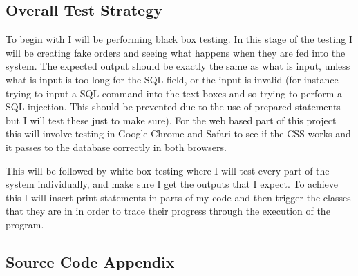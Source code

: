 \documentclass[
11pt, %
a4paper, %
oneside, %
headinclude,footinclude, %
BCOR5mm, %
]{scrartcl}
\begin{document}
\subsection{Overall Test Strategy}
To begin with I will be performing black box testing. In this stage of the testing I will be creating fake orders and seeing what happens when they are fed into the system. The expected output should be exactly the same as what is input, unless what is input is too long for the SQL field, or the input is invalid (for instance trying to input a SQL command into the text-boxes and so trying to perform a SQL injection. This should be prevented due to the use of prepared statements but I will test these just to make sure). For the web based part of this project this will involve testing in Google Chrome and Safari to see if the CSS works and it passes to the database correctly in both browsers.\par This will be followed by white box testing where I will test every part of the system individually, and make sure I get the outputs that I expect. To achieve this I will insert print statements in parts of my code and then trigger the classes that they are in in order to trace their progress through the execution of the program. 






\begin{appendices}
\section{Source Code Appendix}
\inputminted[linenos, breaklines]{java}{/Users/tsmoffat/kitordersystem/kitordersystem/kitordersystem/MainMenu.java}
\inputminted[linenos, breaklines]{java}{/Users/tsmoffat/kitordersystem/kitordersystem/kitordersystem/getConnection.java}
\inputminted[linenos, breaklines]{java}{/Users/tsmoffat/kitordersystem/kitordersystem/kitordersystem/TableViewTest.java}
\inputminted[linenos, breaklines]{java}{/Users/tsmoffat/kitordersystem/kitordersystem/kitordersystem/DocWriter.java}
\inputminted[linenos, breaklines]{java}{/Users/tsmoffat/kitordersystem/kitordersystem/kitordersystem/DBSearch.java}
\inputminted[linenos, breaklines]{java}{/Users/tsmoffat/kitordersystem/kitordersystem/kitordersystem/CSVReader.java}
\inputminted[linenos, breaklines]{java}{/Users/tsmoffat/kitordersystem/kitordersystem/kitordersystem/DBReset.java}
\inputminted[linenos, breaklines]{SQL}{/Users/tsmoffat/kitordersystem/kitordersystem/kitordersystem/KitOrderProper.sql}
\inputminted[linenos, breaklines]{html}{/Users/tsmoffat/kitordersystem/kitordersystem/kitordersystem/WebInput.html}
\inputminted[linenos, breaklines]{html}{/Users/tsmoffat/kitordersystem/kitordersystem/kitordersystem/WebInputOrder.html}
\inputminted[linenos, breaklines]{CSS}{/Users/tsmoffat/kitordersystem/kitordersystem/kitordersystem/styling.css}
\inputminted[linenos, breaklines]{php}{/Users/tsmoffat/kitordersystem/kitordersystem/kitordersystem/dbcustomerupdate.php}
\inputminted[linenos, breaklines]{php}{/Users/tsmoffat/kitordersystem/kitordersystem/kitordersystem/DBOrderUpdate.php}
\restoregeometry
\end{appendices}
\end{document}
